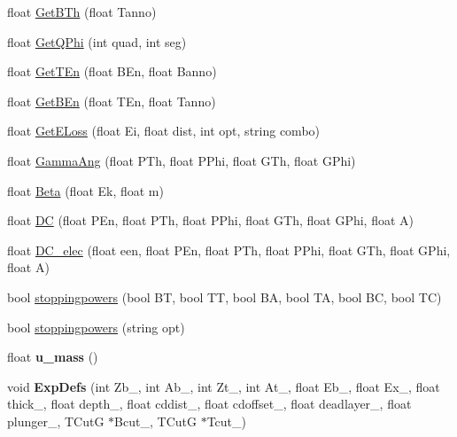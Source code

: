 \begin{DoxyCompactItemize}
\item 
float \hyperlink{classdoppler_ac834d80156ae80009b508ae41fedde3d}{Get\+B\+Th} (float Tanno)
\item 
float \hyperlink{classdoppler_a7c3afd05ed9ddb8c5bedc0de905acd0b}{Get\+Q\+Phi} (int quad, int seg)
\item 
float \hyperlink{classdoppler_a31a09afe8920dc1302162ec8e0be9302}{Get\+T\+En} (float B\+En, float Banno)
\item 
float \hyperlink{classdoppler_a182d987ddc6db4a8b8e7f7821bda3846}{Get\+B\+En} (float T\+En, float Tanno)
\item 
float \hyperlink{classdoppler_a64570ec784dabd6e17cf836489450527}{Get\+E\+Loss} (float Ei, float dist, int opt, string combo)
\item 
float \hyperlink{classdoppler_a6dca381f91f2267abefadd62cf66f69f}{Gamma\+Ang} (float P\+Th, float P\+Phi, float G\+Th, float G\+Phi)
\item 
float \hyperlink{classdoppler_a28eb084d224fdb58fda1d6f6c61dd232}{Beta} (float Ek, float m)
\item 
float \hyperlink{classdoppler_a7f08d93d2bfa269f8c22ac71b604b09a}{DC} (float P\+En, float P\+Th, float P\+Phi, float G\+Th, float G\+Phi, float A)
\item 
float \hyperlink{classdoppler_ad8387753c2288d464b64579a23d3bc4e}{D\+C\+\_\+elec} (float een, float P\+En, float P\+Th, float P\+Phi, float G\+Th, float G\+Phi, float A)
\item 
bool \hyperlink{classdoppler_ad91321c9c9220fff724e5e0982e1a8b8}{stoppingpowers} (bool BT, bool TT, bool BA, bool TA, bool BC, bool TC)
\item 
bool \hyperlink{classdoppler_a4be762591578e28f8e9d646475ca943a}{stoppingpowers} (string opt)
\item 
\mbox{\label{classdoppler_a68d168fdd3cb3edeb4a015aeaf0d3391}} 
float {\bfseries u\+\_\+mass} ()
\item 
\mbox{\label{classdoppler_ab05f91fbb4af54aef0bf595bd1803be8}} 
void {\bfseries Exp\+Defs} (int Zb\+\_\+, int Ab\+\_\+, int Zt\+\_\+, int At\+\_\+, float Eb\+\_\+, float Ex\+\_\+, float thick\+\_\+, float depth\+\_\+, float cddist\+\_\+, float cdoffset\+\_\+, float deadlayer\+\_\+, float plunger\+\_\+, T\+CutG $\ast$Bcut\+\_\+, T\+CutG $\ast$Tcut\+\_\+)
\item 
\mbox{\label{classdoppler_aa3debb227d73f7cdea5b02e4c202cb19}} 

\end{DoxyCompactItemize}
